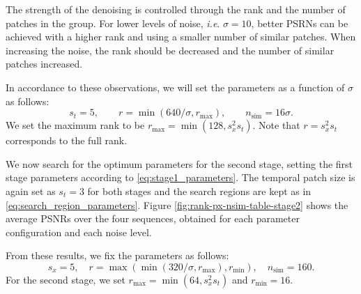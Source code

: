 \documentclass[10pt, journal, twocolumn, final, a4paper]{IEEEtran}
\newcommand{\ie}{\emph{i.e}. } \newcommand{\Ie}{\emph{I.e}. }
\begin{document}
The strength of the denoising is controlled through the rank and the number of
patches in the group. For lower levels of noise, \ie $\sigma = 10$, better
PSRNs can be achieved with a higher rank and using a smaller number of similar
patches. When increasing the noise, the rank should be decreased and the number 
of similar patches increased.

In accordance to these observations, we will set the parameters as a function of
$\sigma$ as follows:
\begin{equation}
	s_t = 5,\quad\quad r = \min(640/\sigma, r_{\text{max}}), \quad\quad n_{\text{sim}} = 16\sigma.
	\label{eq:stage1_parameters}
\end{equation}
We set the maximum rank to be $r_{\text{max}} = \min(128,s_x^2s_t)$. Note that
$r = s_x^2s_t$ corresponds to the full rank.

We now search for the optimum parameters for the second stage, setting the 
first stage parameters according to \eqref{eq:stage1_parameters}. The temporal
patch size is again set as $s_t = 3$ for both stages and the search regions are
kept as in \eqref{eq:search_region_parameters}. Figure
\ref{fig:rank-px-nsim-table-stage2} shows the average PSNRs over the four
sequences, obtained for each parameter configuration and each noise level.

From these results, we fix the parameters as follows:
\begin{equation}
	s_x = 5,\quad r = \max( \min(320/\sigma, r_{\text{max}}), r_{\text{min}}), \quad n_{\text{sim}} = 160.
	\label{eq:stage1_parameters}
\end{equation}
For the second stage, we set $r_{\text{max}} = \min(64,s_x^2s_t)$ and $r_{\text{min}} = 16$.




\end{document}
